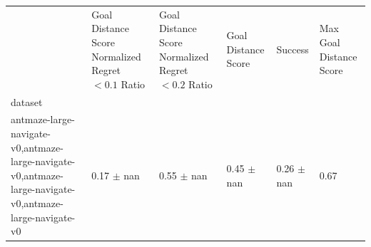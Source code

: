 \begin{tabular}{llllll}
\toprule
 & Goal Distance Score Normalized Regret $< 0.1$ Ratio & Goal Distance Score Normalized Regret $< 0.2$ Ratio & Goal Distance Score & Success & Max Goal Distance Score \\
dataset &  &  &  &  &  \\
\midrule
antmaze-large-navigate-v0,antmaze-large-navigate-v0,antmaze-large-navigate-v0,antmaze-large-navigate-v0 & 0.17 $\pm$ nan & 0.55 $\pm$ nan & 0.45 $\pm$ nan & 0.26 $\pm$ nan & 0.67 \\
\bottomrule
\end{tabular}
